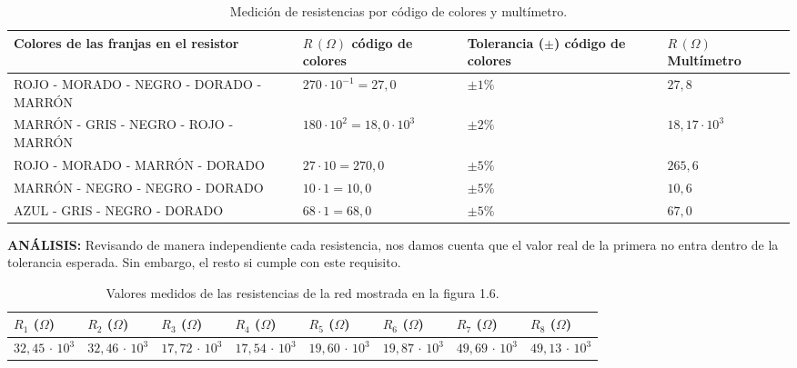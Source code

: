 \documentclass[12pt,a4paper]{article}
\begin{document}
\begin{table}[H]
    \centering
    \fontsize{10pt}{12pt}\selectfont
    \renewcommand{\arraystretch}{1.2}
    \setlength{\tabcolsep}{6pt}
    {
    \begin{tabular}{|C{5.1cm}|C{3.2cm}|C{3.3cm}|C{2.5cm}|}
    \hline
    \textbf{Colores de las franjas en el resistor} &
    \textbf{$R\,(\Omega)$ código de colores} &
    \textbf{Tolerancia ($\pm$) código de colores} &
    \textbf{$R\,(\Omega)$ Multímetro} \\
    \hline
    ROJO - MORADO - NEGRO - DORADO - MARRÓN & $270 \cdot 10^{-1} = 27,0$ & $\pm 1\%$ & $27,8$ \\
    \hline
    MARRÓN - GRIS - NEGRO - ROJO - MARRÓN & $180 \cdot 10^{2} = 18,0 \cdot 10^{3}$ & $\pm 2\%$ & $18,17 \cdot 10^{3}$ \\
    \hline
    ROJO - MORADO - MARRÓN - DORADO & $27 \cdot 10 = 270,0$ & $\pm 5\%$ & $265,6$ \\
    \hline
    MARRÓN - NEGRO - NEGRO - DORADO & $10 \cdot 1 = 10,0$ & $\pm 5\%$ & $10,6$ \\
    \hline
    AZUL - GRIS - NEGRO - DORADO & $68 \cdot 1 = 68,0$ & $\pm 5\%$ & $67,0$ \\
    \hline
    \end{tabular}}
\caption{Medición de resistencias por código de colores y multímetro.}
\label{tab:medicion-resistencias}
\end{table}

\textbf{ANÁLISIS:} Revisando de manera independiente cada resistencia, nos damos cuenta que el valor real de la primera no entra dentro de la tolerancia esperada. Sin embargo, el resto si cumple con este requisito.
\bigskip

\begin{table}[H]
    \centering
    \fontsize{10pt}{12pt}\selectfont
    \renewcommand{\arraystretch}{1.2}
    \setlength{\tabcolsep}{6pt}
    {
    \begin{tabular}{|C{1.45cm}|C{1.45cm}|C{1.45cm}|C{1.45cm}|C{1.45cm}|C{1.45cm}|C{1.45cm}|C{1.45cm}|}
    \hline
    \textbf{$R_1$ ($\Omega$)} &
    \textbf{$R_2$ ($\Omega$)} &
    \textbf{$R_3$ ($\Omega$)} &
    \textbf{$R_4$ ($\Omega$)} &
    \textbf{$R_5$ ($\Omega$)} &
    \textbf{$R_6$ ($\Omega$)} &
    \textbf{$R_7$ ($\Omega$)} &
    \textbf{$R_8$ ($\Omega$)} \\
    \hline
    $32,45\,\cdot\,10^{3}$ & $32,46\,\cdot\,10^{3}$ & $17,72\,\cdot\,10^{3}$ & $17,54\,\cdot\,10^{3}$ & $19,60\,\cdot\,10^{3}$ & $19,87\,\cdot\,10^{3}$ & $49,69\,\cdot\,10^{3}$ & $49,13\,\cdot\,10^{3}$ \\
    \hline
    \end{tabular}}
\caption{Valores medidos de las resistencias de la red mostrada en la figura 1.6.}
\label{tab:red-resistiva-resistencias}
\end{table}
\end{document}
